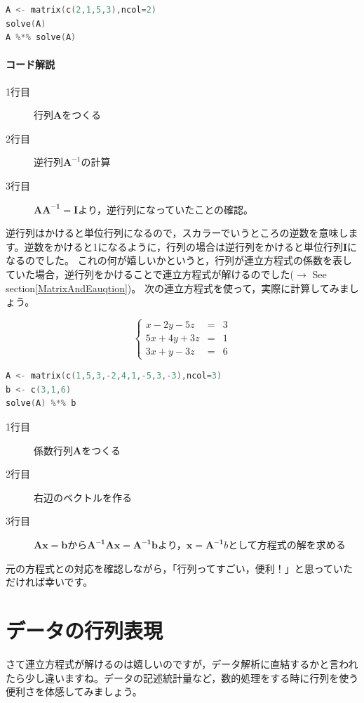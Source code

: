 \documentclass{ltjsbook}
\begin{document}
\begin{lstlisting}[language=c++,label={code::09_04},caption={逆行列の計算}]
A <- matrix(c(2,1,5,3),ncol=2)
solve(A)
A %*% solve(A)
\end{lstlisting}
\paragraph{コード解説}
\begin{description}
    \item[1行目] 行列$\bm{A}$をつくる
    \item[2行目] 逆行列$\bm{A}^{-1}$の計算
    \item[3行目] $\bm{AA^{-1}}=\bm{I}$より，逆行列になっていたことの確認。
\end{description}

逆行列はかけると単位行列になるので，スカラーでいうところの逆数を意味します。逆数をかけると1になるように，行列の場合は逆行列をかけると単位行列$\bm{I}$になるのでした。
これの何が嬉しいかというと，行列が連立方程式の係数を表していた場合，逆行列をかけることで連立方程式が解けるのでした($\to$ See section\ref{MatrixAndEauqtion})。
次の連立方程式を使って，実際に計算してみましょう。

\[ 
\left \{
					\begin{array}{lcl}
					x-2y-5z&=&3\\
					5x+4y+3z&=&1\\
					3x+y-3z&=&6
					\end{array}
					\right .
\]

\begin{lstlisting}[language=c++,label={code::09_05},caption={連立方程式を解く}]
A <- matrix(c(1,5,3,-2,4,1,-5,3,-3),ncol=3)
b <- c(3,1,6)
solve(A) %*% b
\end{lstlisting}
\begin{description}
    \item[1行目] 係数行列$\bm{A}$をつくる
    \item[2行目] 右辺のベクトルを作る
    \item[3行目] $\bm{Ax}=\bm{b}$から$\bm{A^{-1}Ax}=\bm{A^{-1}b}$より，$\bm{x}=\bm{A^{-1}}b$として方程式の解を求める
\end{description}

元の方程式との対応を確認しながら，「行列ってすごい，便利！」と思っていただければ幸いです。

\section{データの行列表現}
さて連立方程式が解けるのは嬉しいのですが，データ解析に直結するかと言われたら少し違いますね。データの記述統計量など，数的処理をする時に行列を使う便利さを体感してみましょう。
\end{document}
